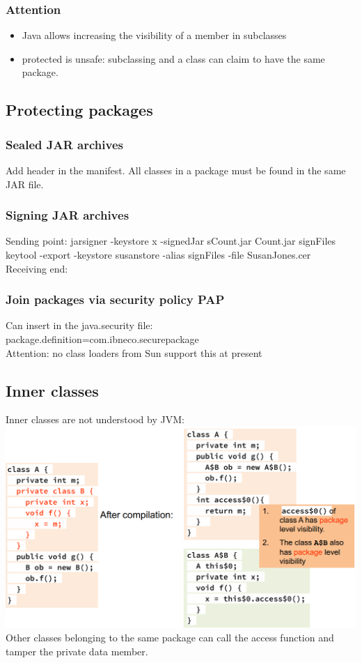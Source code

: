 \documentclass[10pt]{article}
\begin{document}
\subsubsection{Attention}
\begin{itemize}
	\item Java allows increasing the visibility of a member in subclasses
	\item protected is unsafe:  subclassing and a class can claim to have the same package.
\end{itemize}
\subsection{Protecting packages}
\subsubsection{Sealed JAR archives}
Add header in the manifest. 
All classes in a package must be found in the same JAR file.
\subsubsection{Signing JAR archives}
Sending point:
jarsigner -keystore x -signedJar sCount.jar Count.jar signFiles\\ 
keytool -export -keystore susanstore -alias signFiles -file SusanJones.cer\\
Receiving end:\\

\subsubsection{Join packages via security policy PAP}
Can insert in the java.security file:\\
package.definition=com.ibneco.securepackage\\
Attention: no class loaders from Sun support this at present
\subsection{Inner classes}
Inner classes are not understood by JVM:\\
\includegraphics[scale=0.4]{inner_classes_jvm.png}\\
Other classes belonging to the same package can call the access function and tamper the private data member.
\end{document}
